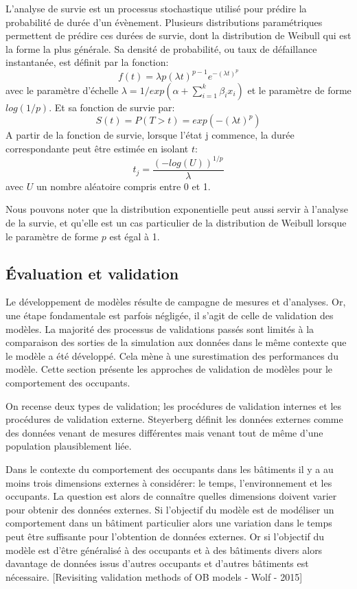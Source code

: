 L'analyse de survie est un processus stochastique utilisé pour prédire la probabilité de durée d'un évènement. Plusieurs distributions paramétriques permettent de prédire ces durées de survie, dont la distribution de Weibull qui est la forme la plus générale. Sa densité de probabilité, ou taux de défaillance instantanée, est définit par la fonction: 
\begin{equation}
f(t) = \lambda p(\lambda t)^{p-1}e^{-(\lambda t)^{p}}
\end{equation}
avec le paramètre d'échelle $\lambda = 1/exp\left( \alpha + \sum\limits_{i=1}^k \beta_{i}x_{i} \right)$ et le paramètre de forme $log(1/p) $. Et sa fonction de survie par:
\begin{equation}
S(t) = P(T>t)=exp(-(\lambda t)^{p})
\end{equation}
A partir de la fonction de survie, lorsque l'état j commence, la durée correspondante peut être estimée en isolant $t$:
\begin{equation}
t_{j}=\frac{(-log(U))^{1/p}}{\lambda}
\end{equation}
avec $U$ un nombre aléatoire compris entre 0 et 1.

Nous pouvons noter que la distribution exponentielle peut aussi servir à l'analyse de la survie, et qu'elle est un cas particulier de la distribution de Weibull lorsque le paramètre de forme $p$ est égal à 1.

\subsection{Évaluation et validation}

Le développement de modèles résulte de campagne de mesures et d'analyses. Or, une étape fondamentale est parfois négligée, il s'agit de celle de validation des modèles. La majorité des processus de validations passés sont limités à la comparaison des sorties de la simulation aux données dans le même contexte que le modèle a été développé. Cela mène à une surestimation des performances du modèle. Cette section présente les approches de validation de modèles pour le comportement des occupants.

On recense deux types de validation; les procédures de validation internes et les procédures de validation externe. Steyerberg \cite{Steyerberg-03} définit les données externes comme des données venant de mesures différentes mais venant tout de même d'une population plausiblement liée.

Dans le contexte du comportement des occupants dans les bâtiments il y a au moins trois dimensions externes à considérer: le temps, l'environnement et les occupants. La question est alors de connaître quelles dimensions doivent varier pour obtenir des données externes. Si l'objectif du modèle est de modéliser un comportement dans un bâtiment particulier alors une variation dans le temps peut être suffisante pour l'obtention de données externes. Or si l'objectif du modèle est d'être généralisé à des occupants et à des bâtiments divers alors davantage de données issus d'autres occupants et d'autres bâtiments est nécessaire.
[Revisiting validation methods of OB models - Wolf - 2015]


